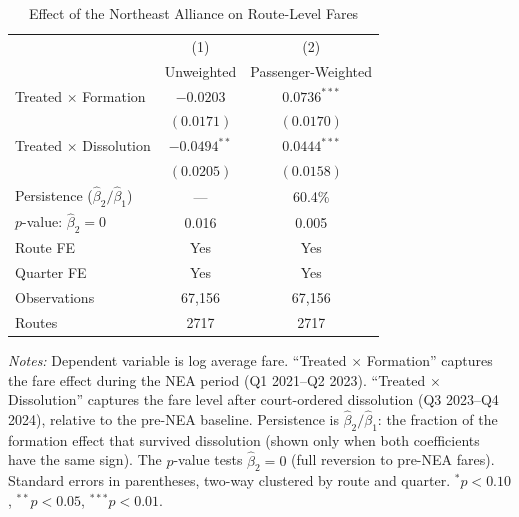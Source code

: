 \begin{table}[H]
\centering
\caption{Effect of the Northeast Alliance on Route-Level Fares}
\label{tab:main}
\begin{threeparttable}
\begin{tabular}{lcc}
\toprule
 & (1) & (2) \\
 & Unweighted & Passenger-Weighted \\
\midrule
Treated $\times$ Formation & $-0.0203$ & $0.0736^{***}$ \\
 & $(0.0171)$ & $(0.0170)$ \\
Treated $\times$ Dissolution & $-0.0494^{**}$ & $0.0444^{***}$ \\
 & $(0.0205)$ & $(0.0158)$ \\
\midrule
Persistence ($\hat{\beta}_2 / \hat{\beta}_1$) & --- & 60.4\% \\
$p$-value: $\hat{\beta}_2 = 0$ & 0.016 & 0.005 \\
\midrule
Route FE & Yes & Yes \\
Quarter FE & Yes & Yes \\
Observations & 67,156 & 67,156 \\
Routes & 2717 & 2717 \\
\bottomrule
\end{tabular}
\begin{tablenotes}[flushleft]
\small
\item \textit{Notes:} Dependent variable is log average fare. ``Treated $\times$ Formation'' captures the fare effect during the NEA period (Q1 2021--Q2 2023). ``Treated $\times$ Dissolution'' captures the fare level after court-ordered dissolution (Q3 2023--Q4 2024), relative to the pre-NEA baseline. Persistence is $\hat{\beta}_2 / \hat{\beta}_1$: the fraction of the formation effect that survived dissolution (shown only when both coefficients have the same sign). The $p$-value tests $\hat{\beta}_2 = 0$ (full reversion to pre-NEA fares). Standard errors in parentheses, two-way clustered by route and quarter. $^{*} p<0.10$, $^{**} p<0.05$, $^{***} p<0.01$.
\end{tablenotes}
\end{threeparttable}
\end{table}

